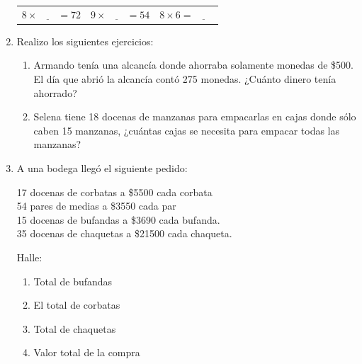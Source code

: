 \documentclass[letterpaper,fleqn]{article}
\begin{document}
\begin{enumerate}
\begin{center}
\begin{tabular}{c|c|c}
$ 8\times\underline{\qquad} = 72 $ & $ 9\times\underline{\qquad}=54 $ & $  8\times6= \underline{\qquad}$\\
\end{tabular}
\end{center}
  \item Realizo los siguientes ejercicios:
  \begin{enumerate}
    \item Armando tenía una alcancía donde ahorraba solamente monedas de \$500. El día que abrió la alcancía contó 275 monedas. ¿Cuánto dinero tenía ahorrado?\noanswer
        \item Selena tiene 18 docenas de manzanas para empacarlas en cajas donde sólo caben 15 manzanas, ¿cuántas cajas se necesita para empacar todas las manzanas?\noanswer
  \end{enumerate}
  \item A una bodega llegó el siguiente pedido:
  \begin{multicols}{2}
    17 docenas de corbatas a \$5500 cada corbata\\
  54 pares de medias a \$3550 cada par\\
  15 docenas de bufandas a \$3690 cada bufanda.\\
  35 docenas de chaquetas a \$21500 cada chaqueta.
  \end{multicols}
    Halle:\\
  \begin{enumerate}
    \item Total de bufandas \hrulefill
    \item El total de corbatas \hrulefill
    \item Total de chaquetas \hrulefill
    \item Valor total de la compra \hrulefill\\ 
    

\end{enumerate}
\end{enumerate}
\end{document}
